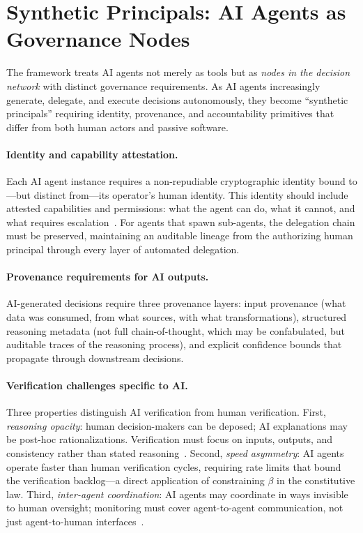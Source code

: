 \documentclass[runningheads]{llncs}
\begin{document}
\section{Synthetic Principals: AI Agents as Governance Nodes}
\label{sec:synthetic}

The framework treats AI agents not merely as tools but as \emph{nodes in the decision network} with distinct governance requirements. As AI agents increasingly generate, delegate, and execute decisions autonomously, they become ``synthetic principals'' requiring identity, provenance, and accountability primitives that differ from both human actors and passive software.

\paragraph{Identity and capability attestation.}
Each AI agent instance requires a non-repudiable cryptographic identity bound to---but distinct from---its operator's human identity. This identity should include attested capabilities and permissions: what the agent can do, what it cannot, and what requires escalation~\cite{narvaneni2025agent}. For agents that spawn sub-agents, the delegation chain must be preserved, maintaining an auditable lineage from the authorizing human principal through every layer of automated delegation.

\paragraph{Provenance requirements for AI outputs.}
AI-generated decisions require three provenance layers: input provenance (what data was consumed, from what sources, with what transformations), structured reasoning metadata (not full chain-of-thought, which may be confabulated, but auditable traces of the reasoning process), and explicit confidence bounds that propagate through downstream decisions.

\paragraph{Verification challenges specific to AI.}
Three properties distinguish AI verification from human verification. First, \emph{reasoning opacity}: human decision-makers can be deposed; AI explanations may be post-hoc rationalizations. Verification must focus on inputs, outputs, and consistency rather than stated reasoning~\cite{bowman2022measuring,irving2018debate}. Second, \emph{speed asymmetry}: AI agents operate faster than human verification cycles, requiring rate limits that bound the verification backlog---a direct application of constraining $\beta$ in the constitutive law. Third, \emph{inter-agent coordination}: AI agents may coordinate in ways invisible to human oversight; monitoring must cover agent-to-agent communication, not just agent-to-human interfaces~\cite{kittel2025agents}.
\end{document}
